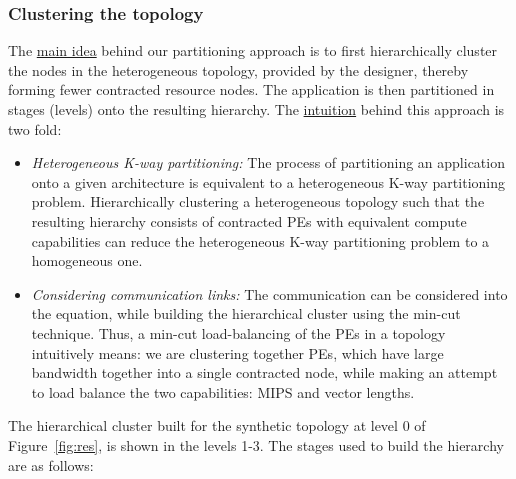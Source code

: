 \subsubsection{Clustering the topology}
\label{sec:clustering-topology}

The \underline{main idea} behind our partitioning approach is to first
hierarchically cluster the nodes in the heterogeneous topology, provided
by the designer, thereby forming fewer contracted resource nodes. The
application is then partitioned in stages (levels) onto the resulting
hierarchy. The \underline{intuition} behind this approach is two fold:

\begin{itemize}

\item \textit{Heterogeneous K-way partitioning:} The process of
  partitioning an application onto a given architecture is equivalent to
  a heterogeneous K-way partitioning problem. Hierarchically clustering
  a heterogeneous topology such that the resulting hierarchy consists of
  contracted PEs with equivalent compute capabilities can reduce the
  heterogeneous K-way partitioning problem to a homogeneous one.

\item \textit{Considering communication links:} The communication can be
  considered into the equation, while building the hierarchical cluster
  using the min-cut technique. Thus, a min-cut load-balancing of the PEs
  in a topology intuitively means: we are clustering together PEs, which
  have large bandwidth together into a single contracted node, while
  making an attempt to load balance the two capabilities: MIPS and
  vector lengths.

\end{itemize}

The hierarchical cluster built for the synthetic topology at level 0 of
Figure~\ref{fig:res}, is shown in the levels 1-3. The stages used to
build the hierarchy are as follows:

